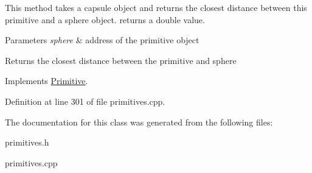 This method takes a capsule object and returns the closest distance between this primitive and a sphere object. returns a double value.


\begin{DoxyParams}{Parameters}
{\em sphere} & address of the primitive object \\
\hline
\end{DoxyParams}
\begin{DoxyReturn}{Returns}
the closest distance between the primitive and sphere 
\end{DoxyReturn}


Implements \hyperlink{class_primitive_adaac4fc4fedf9cd76d4eb9c77e9ae560}{Primitive}.



Definition at line 301 of file primitives.\+cpp.



The documentation for this class was generated from the following files\+:\begin{DoxyCompactItemize}
\item 
primitives.\+h\item 
primitives.\+cpp\end{DoxyCompactItemize}
